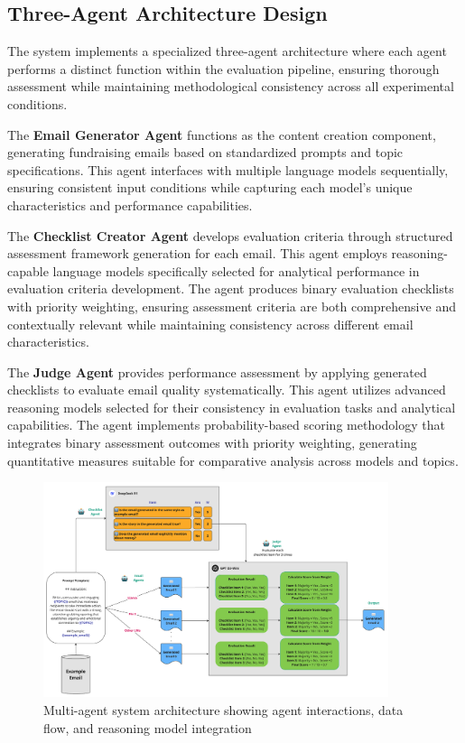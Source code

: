 \subsection{Three-Agent Architecture Design}

The system implements a specialized three-agent architecture where each agent performs a distinct function within the evaluation pipeline, ensuring thorough assessment while maintaining methodological consistency across all experimental conditions.

The \textbf{Email Generator Agent} functions as the content creation component, generating fundraising emails based on standardized prompts and topic specifications. This agent interfaces with multiple language models sequentially, ensuring consistent input conditions while capturing each model's unique characteristics and performance capabilities.

The \textbf{Checklist Creator Agent} develops evaluation criteria through structured assessment framework generation for each email. This agent employs reasoning-capable language models specifically selected for analytical performance in evaluation criteria development. The agent produces binary evaluation checklists with priority weighting, ensuring assessment criteria are both comprehensive and contextually relevant while maintaining consistency across different email characteristics.

The \textbf{Judge Agent} provides performance assessment by applying generated checklists to evaluate email quality systematically. This agent utilizes advanced reasoning models selected for their consistency in evaluation tasks and analytical capabilities. The agent implements probability-based scoring methodology that integrates binary assessment outcomes with priority weighting, generating quantitative measures suitable for comparative analysis across models and topics.

\begin{figure}[htbp]
    \centering
    \includegraphics[width=0.9\textwidth]{figures/agent-diagram.png}
    \caption[Multi-Agent System Architecture]{Multi-agent system architecture showing agent interactions, data flow, and reasoning model integration}
    \label{fig:system-architecture}
\end{figure}

